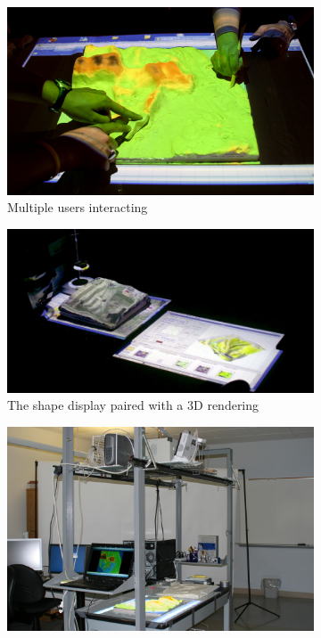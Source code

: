 \documentclass{article}
\begin{document}
\begin{figure}
        \centering
        \begin{subfigure}[b]{0.8\textwidth}
                \includegraphics[trim={0 2cm 0 3cm},clip,width=\textwidth]{images/intro/tangeoms_2_s.jpg}
                \caption{Multiple users interacting}
                \label{fig:intro:tangeoms_1}
        \end{subfigure}
        \medskip
        \begin{subfigure}[b]{0.8\textwidth}
                \includegraphics[trim={0 0 0 2cm},clip,width=\textwidth]{images/intro/tangeoms_1.jpg}
                \caption{The shape display paired with a 3D rendering}
                \label{fig:intro:tangeoms_2}
        \end{subfigure}
        \medskip
        \begin{subfigure}[b]{0.8\textwidth}
                \includegraphics[width=\textwidth]{images/intro/tangeoms_5_s.jpg}

\end{subfigure}
\end{figure}
\end{document}

